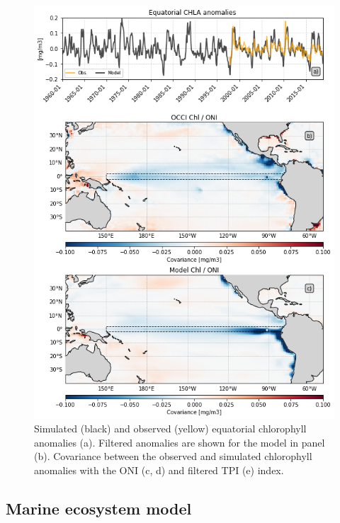 \begin{figure}[htp]
	\centering
	\includegraphics[scale=0.4]{figs/fig2.png}
	\caption{Simulated (black) and observed (yellow) equatorial chlorophyll anomalies (a). Filtered anomalies are shown for the model in panel (b). Covariance between the observed and simulated chlorophyll anomalies with the ONI (c, d) and filtered TPI (e) index.}
	\label{fig:nemo-sat-chl}
\end{figure}

\subsection{Marine ecosystem model}

